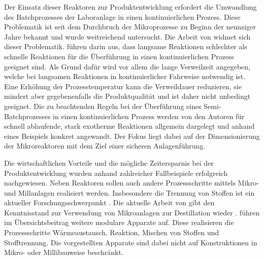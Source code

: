 Der Einsatz dieser Reaktoren zur Produktentwicklung erfordert die Umwandlung des Batchprozesses der Laboranlage in einen kontinuierlichen Prozess. Diese Problematik ist seit dem Durchbruch der Mikroprozesse zu Beginn der neunziger Jahre bekannt und wurde weitreichend untersucht. \cite{Helling_2012} Die Arbeit  von \citeauthor{Hugo_2009} widmet sich dieser Problematik. \citeauthor{Hugo_2009} f\"uhren darin aus, dass langsame Reaktionen schlechter als schnelle Reaktionen f\"ur die \"Uberf\"uhrung in einen kontinuierlichen Prozess geeignet sind. Als Grund daf\"ur wird vor allem die lange Verweilzeit angegeben, welche bei langsamen Reaktionen in kontinuierlicher Fahrweise notwendig ist. Eine Erh\"ohung der Prozesstemperatur kann die Verweildauer reduzieren, sie mindert aber gegebenenfalls die Produktqualit\"at und ist daher nicht unbedingt geeignet. Die zu beachtenden Regeln bei der \"Uberf\"uhrung eines Semi-Batchprozesses in einen kontinuierlichen Prozess werden von den Autoren f\"ur  schnell ablaufende, stark exotherme Reaktionen allgemein dargelegt und anhand eines Beispiels konkret angewandt. Der Fokus liegt dabei auf der Dimensionierung der Mikroreaktoren mit dem Ziel einer sicheren Anlagenf\"uhrung.\cite{Hugo_2009}

Die wirtschaftlichen Vorteile und die m\"ogliche Zeitersparnis bei der Produktentwicklung wurden anhand zahlreicher Fallbeispiele erfolgreich nachgewiesen. \cite{Brodhagen_2012, Behr_2012, Grundemann_2012, Sell_2013} Neben Reaktoren sollen auch andere Prozessschritte mittels Mikro- und Millanlagen realisiert werden. Insbesondere die Trennung von Stoffen ist ein aktueller Forschungsschwerpunkt \cite{Helling_2012}. Die aktuelle Arbeit von \citeauthor{Yang_2017} gibt den Kenntnisstand zur Verwendung von Mikroanlagen zur Destillation wieder \cite{Yang_2017}. \citeauthor{Lier_2016} f\"uhren im \"Ubersichtsbeitrag weitere modulare Apparate auf. Diese realisieren die Prozessschritte W\"armeaustausch, Reaktion, Mischen von Stoffen und Stofftrennung. Die vorgestellten Apparate  sind dabei nicht auf Konstruktionen in Mikro- oder Millibauweise beschr\"ankt. \cite{Lier_2016}

